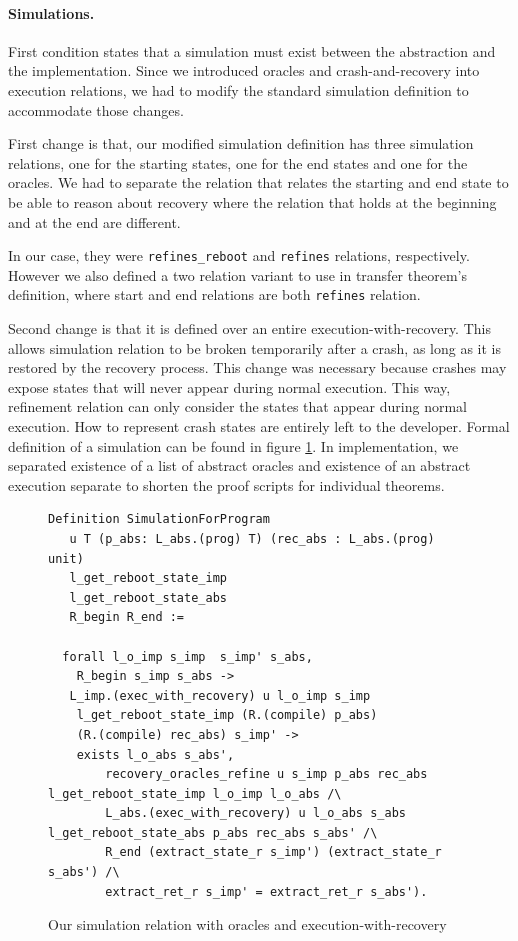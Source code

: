 \paragraph{Simulations.}
First condition states that a simulation must exist between the abstraction and the implementation. Since we introduced oracles and crash-and-recovery into execution relations, we had to modify the standard simulation definition to accommodate those changes. 

First change is that, our modified simulation definition has three simulation relations, one for the starting states, one for the end states and one for the oracles. We had to separate the relation that relates the starting and end state to be able to reason about recovery where the relation that holds at the beginning and at the end are different. 

In our case, they were \texttt{refines\_reboot} and \texttt{refines} relations, respectively. However we also defined a two relation variant to use in transfer theorem's definition, where start and end relations are both \texttt{refines} relation.

Second change is that it is defined over an entire execution-with-recovery. This allows simulation relation to be broken temporarily after a crash, as long as it is restored by the recovery process. This change was necessary because crashes may expose states that will never appear during normal execution. This way, refinement relation can only consider the states that appear during normal execution. How to represent crash states are entirely left to the developer. Formal definition of a simulation can be found in figure \ref{fig:Simulation_Definition}. In implementation, we separated existence of a list of abstract oracles and existence of an abstract execution separate to shorten the proof scripts for individual theorems.   

\begin{figure}[ht]
    \centering
    \begin{verbatim}
Definition SimulationForProgram
   u T (p_abs: L_abs.(prog) T) (rec_abs : L_abs.(prog) unit)
   l_get_reboot_state_imp
   l_get_reboot_state_abs
   R_begin R_end :=
   
  forall l_o_imp s_imp  s_imp' s_abs,
    R_begin s_imp s_abs ->
   L_imp.(exec_with_recovery) u l_o_imp s_imp
    l_get_reboot_state_imp (R.(compile) p_abs)
    (R.(compile) rec_abs) s_imp' ->
    exists l_o_abs s_abs',
        recovery_oracles_refine u s_imp p_abs rec_abs l_get_reboot_state_imp l_o_imp l_o_abs /\
        L_abs.(exec_with_recovery) u l_o_abs s_abs l_get_reboot_state_abs p_abs rec_abs s_abs' /\
        R_end (extract_state_r s_imp') (extract_state_r s_abs') /\
        extract_ret_r s_imp' = extract_ret_r s_abs').
\end{verbatim}
    \caption{Our simulation relation with oracles and execution-with-recovery}
    \label{fig:Simulation_Definition}
\end{figure}




